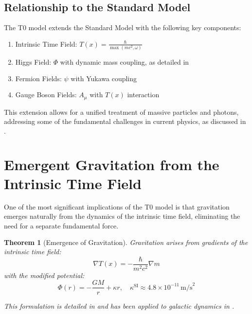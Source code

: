 \documentclass[12pt,a4paper]{article}
\newcommand{\Tfield}{T(x)}
\newtheorem{theorem}{Theorem}[section]
\theoremstyle{definition}
\theoremstyle{remark}
\begin{document}
	\subsection{Relationship to the Standard Model}
	The T0 model extends the Standard Model with the following key components:
	\begin{enumerate}
		\item Intrinsic Time Field: \( \Tfield = \frac{\hbar}{\max(m c^2, \omega)} \)
		\item Higgs Field: \( \Phi \) with dynamic mass coupling, as detailed in \cite{pascher_higgs_2025}
		\item Fermion Fields: \( \psi \) with Yukawa coupling
		\item Gauge Boson Fields: \( A_\mu \) with \( \Tfield \) interaction
	\end{enumerate}
	
	This extension allows for a unified treatment of massive particles and photons, addressing some of the fundamental challenges in current physics, as discussed in \cite{pascher_erweiterung_2025}.
	
	\section{Emergent Gravitation from the Intrinsic Time Field}
	One of the most significant implications of the T0 model is that gravitation emerges naturally from the dynamics of the intrinsic time field, eliminating the need for a separate fundamental force.
	
	\begin{theorem}[Emergence of Gravitation]
		Gravitation arises from gradients of the intrinsic time field:
		\begin{equation}
			\nabla \Tfield = -\frac{\hbar}{m^2 c^2} \nabla m
		\end{equation}
		with the modified potential:
		\begin{equation}
			\Phi(r) = -\frac{GM}{r} + \kappa r, \quad \kappa^{\text{SI}} \approx 4.8 \times 10^{-11} \, \text{m/s}^2
		\end{equation}
		
		This formulation is detailed in \cite{pascher_emergente_gravitation_2025} and has been applied to galactic dynamics in \cite{pascher_galaxies_2025}.
	\end{theorem}
	
\end{document}
